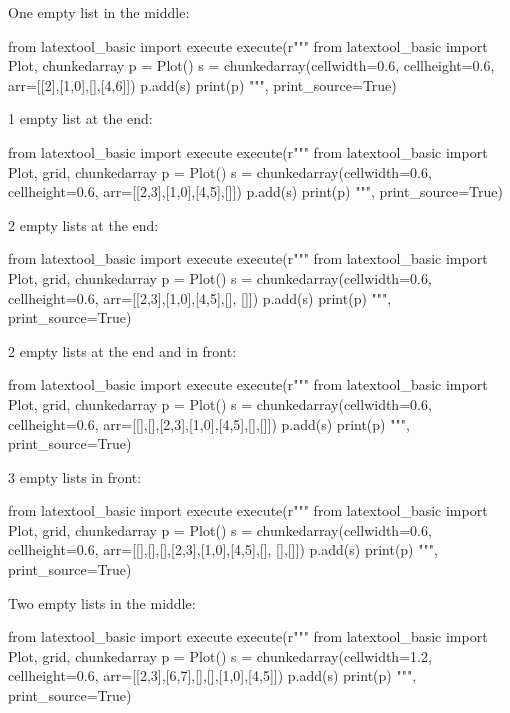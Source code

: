 One empty list in the middle:
\begin{python}
from latextool_basic import execute
execute(r"""
from latextool_basic import Plot, chunkedarray
p = Plot()
s = chunkedarray(cellwidth=0.6,
                 cellheight=0.6,
                 arr=[[2],[1,0],[],[4,6]])
p.add(s)
print(p)
""", print_source=True)
\end{python}



1 empty list at the end:
\begin{python}
from latextool_basic import execute
execute(r"""
from latextool_basic import Plot, grid, chunkedarray
p = Plot()
s = chunkedarray(cellwidth=0.6,
                 cellheight=0.6,
                 arr=[[2,3],[1,0],[4,5],[]])
p.add(s)
print(p)
""", print_source=True)
\end{python}



2 empty lists at the end:
\begin{python}
from latextool_basic import execute
execute(r"""
from latextool_basic import Plot, grid, chunkedarray
p = Plot()
s = chunkedarray(cellwidth=0.6,
                 cellheight=0.6,
                 arr=[[2,3],[1,0],[4,5],[], []])
p.add(s)
print(p)
""", print_source=True)
\end{python}



2 empty lists at the end and in front:
\begin{python}
from latextool_basic import execute
execute(r"""
from latextool_basic import Plot, grid, chunkedarray
p = Plot()
s = chunkedarray(cellwidth=0.6,
                 cellheight=0.6,
                 arr=[[],[],[2,3],[1,0],[4,5],[],[]])
p.add(s)
print(p)
""", print_source=True)
\end{python}



3 empty lists in front:
\begin{python}
from latextool_basic import execute
execute(r"""
from latextool_basic import Plot, grid, chunkedarray
p = Plot()
s = chunkedarray(cellwidth=0.6,
                 cellheight=0.6,
                 arr=[[],[],[],[2,3],[1,0],[4,5],[], [],[]])
p.add(s)
print(p)
""", print_source=True)
\end{python}










Two empty lists in the middle:
\begin{python}
from latextool_basic import execute
execute(r"""
from latextool_basic import Plot, grid, chunkedarray
p = Plot()
s = chunkedarray(cellwidth=1.2,
                 cellheight=0.6,
                 arr=[[2,3],[6,7],[],[],[1,0],[4,5]])
p.add(s)
print(p)
""", print_source=True)
\end{python}



